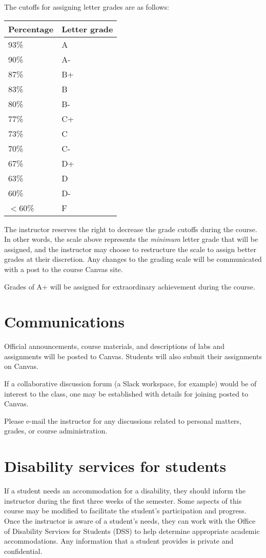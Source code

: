 \documentclass[12pt,twoside]{article}
\renewcommand\_{\textunderscore\allowbreak}
\begin{document}
The cutoffs for assigning letter grades are as follows:

\begin{center}
\begin{tabular}{l|l}
\hline
{\bf Percentage} & {\bf Letter grade} \\
\hline
93\% & A \\
90\% & A- \\
87\% & B+ \\
83\% & B \\
80\% & B- \\
77\% & C+ \\
73\% & C \\
70\% & C- \\
67\% & D+ \\
63\% & D \\
60\% & D- \\
$<$60\% & F \\
\hline
\end{tabular}
\end{center}
The instructor reserves the right to decrease the grade cutoffs during the
course. In other words, the scale above represents the \emph{minimum} letter
grade that will be assigned, and the instructor may choose to restructure the
scale to assign better grades at their discretion. Any changes to the grading
scale will be communicated with a post to the course Canvas site.

Grades of A+ will be assigned for extraordinary achievement during the course.

\section{Communications}

Official announcements, course materials, and descriptions of labs and
assignments will be posted to Canvas. Students will also submit their
assignments on Canvas.

If a collaborative discussion forum (a Slack workspace, for example) would be
of interest to the class, one may be established with details for joining
posted to Canvas.

Please e-mail the instructor for any discussions related to personal matters,
grades, or course administration.

\section{Disability services for students}

If a student needs an accommodation for a disability, they should inform the
instructor during the first three weeks of the semester. Some aspects of this
course may be modified to facilitate the student's participation and progress.
Once the instructor is aware of a student's needs, they can work with the
Office of Disability Services for Students (DSS) to help determine appropriate
academic accommodations. Any information that a student provides is private and
confidential.
\end{document}

